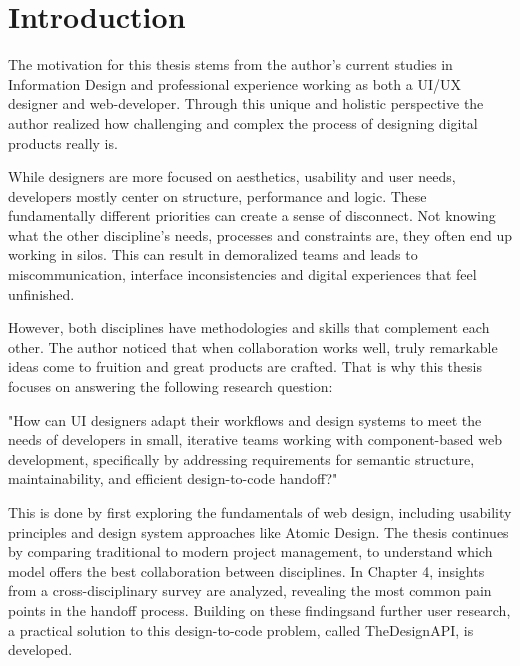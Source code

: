 \newpage
\section{Introduction}
The motivation for this thesis stems from the author's current studies in Information Design and
professional experience working as both a UI/UX designer and web-developer. Through this unique and
holistic perspective the author realized how challenging and complex the process of designing
digital products really is. 

While designers are more focused on aesthetics, usability and user needs, developers mostly center
on structure, performance and logic. These fundamentally different priorities can create a sense of
disconnect. Not knowing what the other discipline's needs, processes and constraints are, they often
end up working in silos. This can result in demoralized teams and leads to miscommunication,
interface inconsistencies and digital experiences that feel unfinished.

However, both disciplines have methodologies and skills that complement each other. The author
noticed that when collaboration works well, truly remarkable ideas come to fruition and great
products are crafted. That is why this thesis focuses on answering the following research question:

"How can UI designers adapt their workflows and design systems to meet the needs of developers in
small, iterative teams working with component-based web development, specifically by addressing
requirements for semantic structure, maintainability, and efficient design-to-code handoff?"

This is done by first exploring the fundamentals of web design, including usability principles and
design system approaches like Atomic Design. The thesis continues by comparing traditional to modern
project management, to understand which model offers the best collaboration between disciplines. In
Chapter 4, insights from a cross-disciplinary survey are analyzed, revealing the most common pain
points in the handoff process. Building on these findingsand further user research, a practical
solution to this design-to-code problem, called TheDesignAPI, is developed. 
